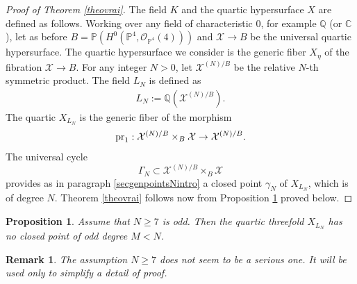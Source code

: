 \documentclass[10pt]{article}
\newtheorem{prop}[theo]{Proposition}
\newtheorem{rema}[theo]{Remark}
\begin{document}
\begin{proof}[Proof of Theorem \ref{theovrai}]  The field $K$ and the quartic hypersurface $X$ are defined as follows. Working over any field of characteristic $0$, for example $\mathbb{Q}$ (or $\mathbb{C}$), let as before
$B=\mathbb{P}(H^0(\mathbb{P}^4,\mathcal{O}_{\mathbb{P}^4}(4)))$ and $ \mathcal{X}\rightarrow B$
 be the universal quartic hypersurface. The quartic hypersurface we consider is the generic fiber $X_\eta$ of the fibration $ \mathcal{X}\rightarrow B$. For any integer $N>0$, let $\mathcal{X}^{(N)/B}$ be the relative $N$-th symmetric product. The field $L_N$ is defined  as
\begin{eqnarray}\label{eqpourK} L_N:=\mathbb{Q}(\mathcal{X}^{(N)/B}).
\end{eqnarray}
The quartic $X_{L_N}$ is the generic fiber of the morphism
$${\rm pr}_1: \mathcal{X}^{(N)/B}\times_B\mathcal{X}\rightarrow \mathcal{X}^{(N)/B}.$$
The universal cycle
$$\Gamma_N\subset \mathcal{X}^{(N)/B}\times_B\mathcal{X}$$
provides as in paragraph \ref{secgenpointsNintro} a closed point $\gamma_{N}$ of $X_{L_N}$, which is of degree $N$.
Theorem \ref{theovrai} follows now from Proposition \ref{profinal} proved below.
\end{proof}
\begin{prop} \label{profinal} Assume that $N\geq 7$ is odd. Then the quartic threefold $X_{L_N}$ has no closed point of odd degree $M<N$.
\end{prop}
\begin{rema}{\rm The assumption $N\geq 7$ does  not seem to be a serious one. It will be used   only to simplify a detail of proof.}
\end{rema}
\end{document}
